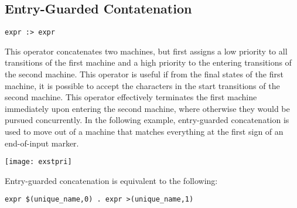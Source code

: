 \documentclass[letterpaper,11pt,oneside]{book}
\newcommand{\verbspace}{\vspace{10pt}}
\begin{document}
\begin{comment}
Example from 2 page poster paper.
\begin{verbatim}
main := ( lower+ ':' ' '* <: (
    ( lower ( lower | digit )* ) >mark %id | 
    digit+ >mark %number | 
    ' '+ >mark %ws
)** '\n' )*;
\end{verbatim}

\begin{center}
\texttt{[image: lmkleene]}
\end{center}
\end{comment}

\subsection{Entry-Guarded Contatenation}

\verb|expr :> expr| 
\verbspace

This operator concatenates two machines, but first assigns a low
priority to all transitions
of the first machine and a high priority to the entering transitions of the
second machine. This operator is useful if from the final states of the first
machine, it is possible to accept the characters in the start transitions of
the second machine. This operator effectively terminates the first machine
immediately upon entering the second machine, where otherwise they would be
pursued concurrently. In the following example, entry-guarded concatenation is
used to move out of a machine that matches everything at the first sign of an
end-of-input marker.

\begin{comment}
\begin{verbatim}
# Leave the catch-all machine on the first character of FIN.
main := any* :> 'FIN';
\end{verbatim}
\end{comment}

\begin{center}
\texttt{[image: exstpri]}
\end{center}


Entry-guarded concatenation is equivalent to the following:

\verbspace
\begin{verbatim}
expr $(unique_name,0) . expr >(unique_name,1)
\end{verbatim}
\end{document}
